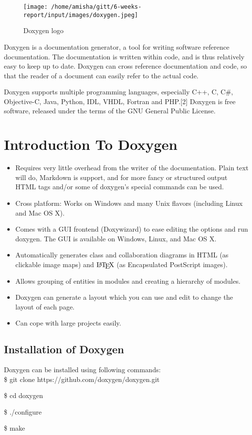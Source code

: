 
\begin{figure}[ht]
\centering \texttt{[image: /home/amisha/gitt/6-weeks-report/input/images/doxygen.jpeg]}
\caption{Doxygen logo}
\end{figure}
\noindent Doxygen is a documentation generator, a tool for writing software reference 
documentation. The documentation is written within code, and is thus 
relatively easy to keep up to date. Doxygen can cross reference 
documentation and code, so that the reader of a document can easily 
refer to the actual code.

Doxygen supports multiple programming languages, especially C++, C, 
C\#, Objective-C, Java, Python, IDL, VHDL, Fortran and PHP.[2] Doxygen
 is free software, released under the terms of the GNU General Public 
License.\\

\section{Introduction To Doxygen}
\begin{itemize}
\item Requires very little overhead from the writer of the documentation. 
Plain text will do, Markdown is support, and for more fancy or structured 
output HTML tags and/or some of doxygen's special commands can be used.
\item Cross platform: Works on Windows and many Unix flavors (including 
Linux and Mac OS X).
\item Comes with a GUI frontend (Doxywizard) to ease editing the options 
and run doxygen. The GUI is available on Windows, Linux, and Mac OS X.
\item Automatically generates class and collaboration diagrams in HTML 
(as clickable image maps) and $\mbox{\LaTeX}$ (as Encapsulated PostScript 
images).
\item Allows grouping of entities in modules and creating a hierarchy 
of modules.
\item Doxygen can generate a layout which you can use and edit to change 
the layout of each page.
\item Can cope with large projects easily.
\end{itemize}
\subsection{Installation of Doxygen}
Doxygen can be installed using following commands:\\

\hspace{4pt} \$ git clone https://github.com/doxygen/doxygen.git

\hspace{4pt} \$ cd doxygen

\hspace{4pt} \$ ./configure

\hspace{4pt} \$ make



